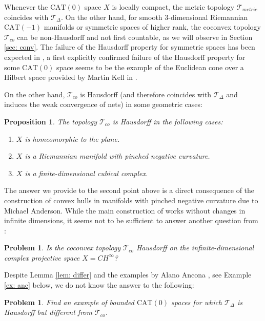 \documentclass[12pt,leqno]{amsart}
\numberwithin{equation}{section}
\newtheorem{prop}[thm]{Proposition}
\newtheorem{quest}[thm]{Problem}
\theoremstyle{remark}
\newcommand{\CAT}{\mathrm{CAT}}
\begin{document}
Whenever the $\CAT(0)$ space $X$ is locally compact, the metric topology $\mathcal T_{metric}$ coincides with $\mathcal T_{\Delta}$.
On the other hand, for smooth 3-dimensional Riemannian $\CAT(-1)$ manifolds or symmetric spaces of higher rank, the coconvex topology $\mathcal T_{co}$ can be non-Hausdorff and not first countable, as we will observe in Section \ref{sec: conv}.
The failure of the Hausdorff property for symmetric spaces has been expected in \cite{Monod},  a first explicitly  confirmed failure
of the Hausdorff property for some $\CAT(0)$ space seems to be the example of the Euclidean cone over a Hilbert space provided by Martin Kell in \cite{Kell}.

On the other hand,
$\mathcal T_{co}$ is Hausdorff (and therefore coincides with $\mathcal T_{\Delta}$ and induces the weak convergence of nets) in some geometric cases:

\begin{prop} \label{prop: cohaus}
The topology $\mathcal T_{co}$ is Hausdorff in the following cases:
\begin{enumerate}
\item $X$ is homeomorphic to the plane.
\item $X$ is a Riemannian manifold with pinched negative curvature. 
\item $X$ is a finite-dimensional cubical complex.
\end{enumerate}
\end{prop}


The answer we provide to the second point above is a direct consequence of the construction of convex hulls in manifolds with pinched negative curvature due to Michael Anderson. While the main construction of \cite{Anderson} works without changes in infinite dimensions,
it seems not to be sufficient to answer another question from \cite{Monod}:

\begin{quest}
Is the coconvex topology $\mathcal T_{co}$ Hausdorff on the infinite-dimensional complex projective space $X=CH^{\infty}$? 
\end{quest}

Despite Lemma \ref{lem: differ} and the examples by Alano Ancona \cite{Ancona}, see Example \ref{ex: anc} below,
we do not know the answer to the following:

\begin{quest}
Find an example of bounded $\CAT(0)$ spaces for which $\mathcal T_{\Delta}$ is Hausdorff but different from $\mathcal T_{co}$. 
\end{quest}
\end{document}
